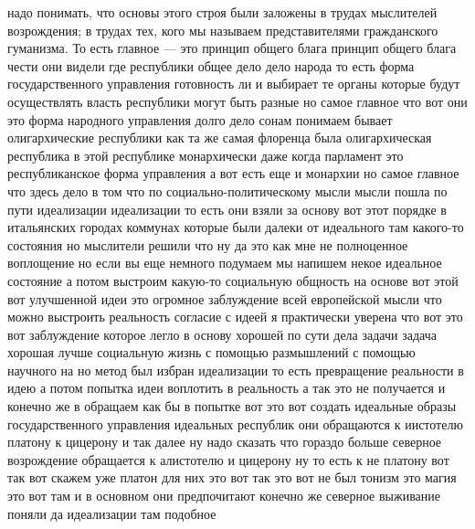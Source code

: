 надо понимать, что основы этого строя были заложены в трудах мыслителей
возрождения; в трудах тех, кого мы называем представителями гражданского гуманизма.
То есть главное — это принцип общего блага принцип общего блага чести они видели
где республики общее дело дело народа то есть форма государственного управления
готовность ли и выбирает те органы которые будут осуществлять власть республики
могут быть разные но самое главное что вот они это форма народного управления
долго дело сонам понимаем бывает олигархические республики как та же самая
флоренца была олигархическая республика в этой республике монархически даже
когда парламент это республиканское форма управления а вот есть еще и монархии
но самое главное что здесь дело в том что по социально-политическому мысли мысли
пошла по пути идеализации идеализации то есть они взяли за основу вот этот
порядке в итальянских городах коммунах которые были далеки от идеального там
какого-то состояния но мыслители решили что ну да это как мне не полноценное
воплощение но если вы еще немного подумаем мы напишем некое идеальное состояние
а потом выстроим какую-то социальную общность на основе вот этой вот улучшенной
идеи это огромное заблуждение всей европейской мысли что можно выстроить
реальность согласие с идеей я практически уверена что вот это вот заблуждение
которое легло в основу хорошей по сути дела задачи задача хорошая лучше
социальную жизнь с помощью размышлений с помощью научного на но метод был избран
идеализации то есть превращение реальности в идею а потом попытка идеи воплотить
в реальность а так это не получается и конечно же в обращаем как бы в попытке
вот это вот создать идеальные образы государственного управления идеальных
республик они обращаются к иистотелю платону к цицерону и так далее ну надо
сказать что гораздо больше северное возрождение обращается к алистотелю и
цицерону ну то есть к не платону вот так вот скажем уже платон для них это вот
так это вот не был тонизм это магия это вот там и в основном они предпочитают
конечно же северное выживание поняли да идеализации там подобное 

